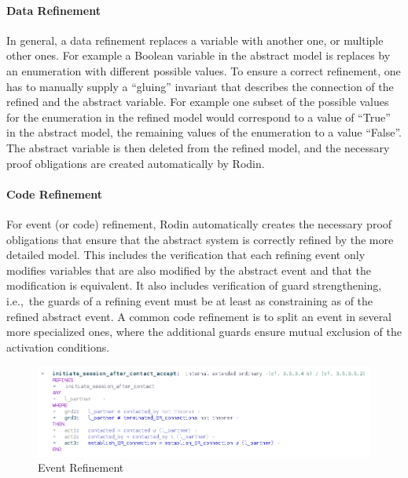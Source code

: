 \paragraph{Data Refinement}
\label{sec:data-refinement}

In general, a data refinement replaces a variable with another one, or multiple
other ones. For example a Boolean variable in the abstract model is replaces by
an enumeration with different possible values. To ensure a correct refinement,
one has to manually supply a ``gluing'' invariant that describes the connection
of the refined and the abstract variable. For example one subset of the possible
values for the enumeration in the refined model would correspond to a value of
``True'' in the abstract model, the remaining values of the enumeration to a
value ``False''. The abstract variable is then deleted from the refined model,
and the necessary proof obligations are created automatically by Rodin.


\paragraph{Code Refinement}
\label{sec:code-refinement}

For event (or code) refinement, Rodin automatically creates the necessary proof
obligations that ensure that the abstract system is correctly refined by the
more detailed model. This includes the verification that each refining event
only modifies variables that are also modified by the abstract event and that
the modification is equivalent. It also includes verification of guard
strengthening, i.e.,\ the guards of a refining event must be at least as
constraining as of the refined abstract event. A common code refinement is to
split an event in several more specialized ones, where the additional guards
ensure mutual exclusion of the activation conditions.

\begin{figure}[ht]
  \centering
  \includegraphics[width=.9\textwidth]{figures/EventRefine}
  \caption{Event Refinement}
  \label{fig:event-refine}
\end{figure}

